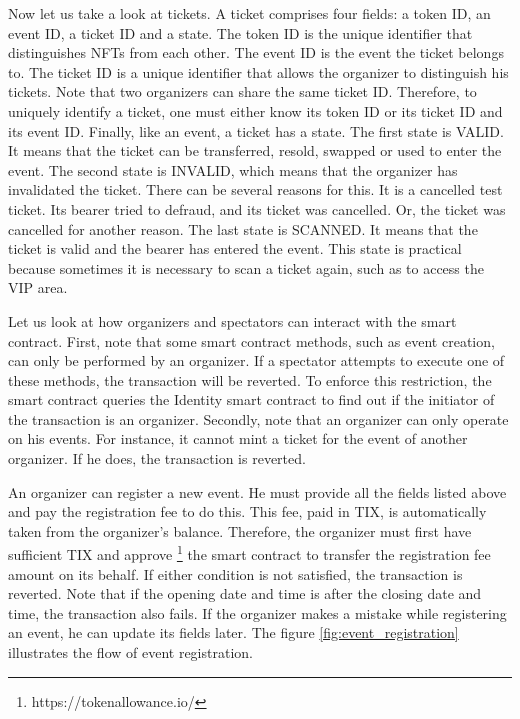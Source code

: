 \documentclass[a4paper,11pt,oneside]{report}
\begin{document}
Now let us take a look at tickets. A ticket comprises four fields: a token ID, an event ID, a ticket ID and a state. The token ID is the unique identifier that distinguishes NFTs from each other. The event ID is the event the ticket belongs to. The ticket ID is a unique identifier that allows the organizer to distinguish his tickets. Note that two organizers can share the same ticket ID. Therefore, to uniquely identify a ticket, one must either know its token ID or its ticket ID and its event ID. Finally, like an event, a ticket has a state. The first state is VALID. It means that the ticket can be transferred, resold, swapped or used to enter the event. The second state is INVALID, which means that the organizer has invalidated the ticket. There can be several reasons for this. It is a cancelled test ticket. Its bearer tried to defraud, and its ticket was cancelled. Or, the ticket was cancelled for another reason. The last state is SCANNED. It means that the ticket is valid and the bearer has entered the event. This state is practical because sometimes it is necessary to scan a ticket again, such as to access the VIP area.

Let us look at how organizers and spectators can interact with the smart contract. First, note that some smart contract methods, such as event creation, can only be performed by an organizer. If a spectator attempts to execute one of these methods, the transaction will be reverted. To enforce this restriction, the smart contract queries the Identity smart contract to find out if the initiator of the transaction is an organizer. Secondly, note that an organizer can only operate on his events. For instance, it cannot mint a ticket for the event of another organizer. If he does, the transaction is reverted.

An organizer can register a new event. He must provide all the fields listed above and pay the registration fee to do this. This fee, paid in TIX, is automatically taken from the organizer's balance. Therefore, the organizer must first have sufficient TIX and approve \footnote{https://tokenallowance.io/} the smart contract to transfer the registration fee amount on its behalf. If either condition is not satisfied, the transaction is reverted. Note that if the opening date and time is after the closing date and time, the transaction also fails. If the organizer makes a mistake while registering an event, he can update its fields later. The figure \hyperref[fig:event_registration]{\ref{fig:event_registration}} illustrates the flow of event registration.
\end{document}
